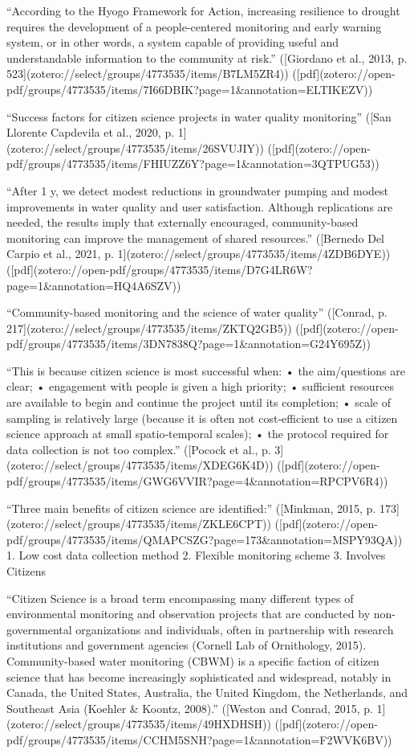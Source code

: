 {“According to the Hyogo Framework for Action, increasing resilience to drought requires the development of a people-centered monitoring and early warning system, or in other words, a system capable of providing useful and understandable information to the community at risk.” ([Giordano et al., 2013, p. 523](zotero://select/groups/4773535/items/B7LM5ZR4)) ([pdf](zotero://open-pdf/groups/4773535/items/7I66DBIK?page=1&annotation=ELTIKEZV))

“Success factors for citizen science projects in water quality monitoring” ([San Llorente Capdevila et al., 2020, p. 1](zotero://select/groups/4773535/items/26SVUJIY)) ([pdf](zotero://open-pdf/groups/4773535/items/FHIUZZ6Y?page=1&annotation=3QTPUG53))

“After 1 y, we detect modest reductions in groundwater pumping and modest improvements in water quality and user satisfaction. Although replications are needed, the results imply that externally encouraged, community-based monitoring can improve the management of shared resources.” ([Bernedo Del Carpio et al., 2021, p. 1](zotero://select/groups/4773535/items/4ZDB6DYE)) ([pdf](zotero://open-pdf/groups/4773535/items/D7G4LR6W?page=1&annotation=HQ4A6SZV))

“Community-based monitoring and the science of water quality” ([Conrad, p. 217](zotero://select/groups/4773535/items/ZKTQ2GB5)) ([pdf](zotero://open-pdf/groups/4773535/items/3DN7838Q?page=1&annotation=G24Y695Z))

“This is because citizen  science is most successful when:   
• the aim/questions are clear;  
• engagement with people is given a high priority;  
• sufficient resources are available to begin and continue the project until its completion;  
• scale of sampling is relatively large (because it is often not cost‐efficient to use a citizen  science approach at small spatio‐temporal scales);  
• the protocol required for data collection is not too complex.”
([Pocock et al., p. 3](zotero://select/groups/4773535/items/XDEG6K4D)) ([pdf](zotero://open-pdf/groups/4773535/items/GWG6VVIR?page=4&annotation=RPCPV6R4))

“Three main benefits of citizen science are identified:” ([Minkman, 2015, p. 173](zotero://select/groups/4773535/items/ZKLE6CPT)) ([pdf](zotero://open-pdf/groups/4773535/items/QMAPCSZG?page=173&annotation=MSPY93QA))
1. Low cost data collection method
2. Flexible monitoring scheme
3. Involves Citizens


“Citizen Science is a broad term encompassing many different types of environmental monitoring and observation projects that are conducted by non-governmental organizations and individuals, often in partnership with research institutions and government agencies (Cornell Lab of Ornithology, 2015). Community-based water monitoring (CBWM) is a specific faction of citizen science that has become increasingly sophisticated and widespread, notably in Canada, the United States, Australia, the United Kingdom, the Netherlands, and Southeast Asia (Koehler & Koontz, 2008).” ([Weston and Conrad, 2015, p. 1](zotero://select/groups/4773535/items/49HXDHSH)) ([pdf](zotero://open-pdf/groups/4773535/items/CCHM5SNH?page=1&annotation=F2WVK6BV))

}
